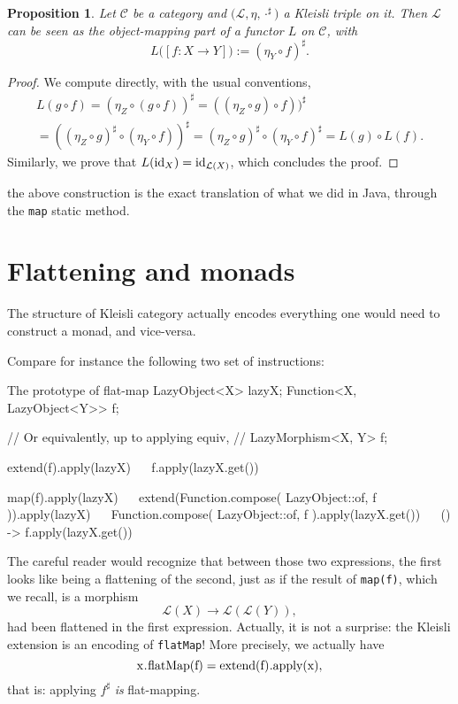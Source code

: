 \documentclass[12pt,a4paper]{report}
\renewcommand{\baselinestretch}{1.5}
\theoremstyle{theorem}
\newtheorem{proposition}{Proposition}
\theoremstyle{definition}
\begin{document}
\begin{proposition}
Let $\mathcal{C}$ be a category and
$\big(\mathcal{L},\eta,\cdot^\sharp\big)$ a Kleisli triple on it.
Then $\mathcal{L}$ can be seen as the object-mapping part of a 
functor $L$ on $\mathcal{C}$,
with
	\[ L\big([f: X\to Y]\big) := (\eta_Y\circ f)^\sharp .\]
\end{proposition}
\begin{proof}
We compute directly,
with the usual conventions,
	\begin{multline*}
		L(g\circ f)
		= (\eta_Z\circ (g\circ f))^\sharp
		= ((\eta_Z\circ g)\circ f))^\sharp
		\\= ((\eta_Z\circ g)^\sharp \circ (\eta_Y\circ f))^\sharp
		= (\eta_Z\circ g)^\sharp \circ (\eta_Y\circ f)^\sharp
		= L(g)\circ L(f) . \end{multline*}
Similarly, we prove that $L({\rm id}_X)={\rm id}_{\mathcal{L}(X)}$,
which concludes the proof.
\end{proof}
the above construction is the exact translation of what we did
in Java, through the \lstinline{map}{} static method.

\section{Flattening and monads}

The structure of Kleisli category actually encodes everything one
would need to construct a monad, and vice-versa.

Compare for instance the following two set of instructions:

\renewcommand{\baselinestretch}{1} 
\selectfont

\begin{javacode}{The prototype of flat-map}
LazyObject<X> lazyX;
Function<X, LazyObject<Y>> f;

// Or equivalently, up to applying equiv,
// LazyMorphism<X, Y> f;

extend(f).apply(lazyX)
 ~~ f.apply(lazyX.get())

map(f).apply(lazyX)
 ~~ extend(Function.compose(
      LazyObject::of, f
    )).apply(lazyX)
 ~~ Function.compose(
      LazyObject::of, f
    ).apply(lazyX.get())
 ~~ () -> f.apply(lazyX.get())
\end{javacode}

\renewcommand{\baselinestretch}{1.5} 
\selectfont

The careful reader would recognize that between those two expressions,
the first looks like being a flattening of the second,
just as if the result of \lstinline{map(f)}{}, which we recall, is
a morphism
	\[ \mathcal{L}(X) \to \mathcal{L}(\mathcal{L}(Y)) ,\]
had been flattened in the first expression.
Actually, it is not a surprise: the Kleisli extension is
an encoding of \lstinline{flatMap}{}! More precisely,
we actually have
	\[ \text{\lstinline{x.flatMap(f)}{}}
		= \text{\lstinline{extend(f)}.apply(x){}} ,\]
that is: applying $f^\sharp$ \emph{is} flat-mapping.
\end{document}
